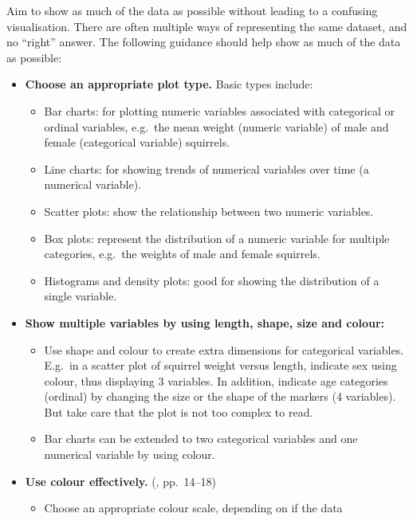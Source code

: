 \documentclass[10pt]{article}
\begin{document}
\begin{multicols}{3}
Aim to show as much of the data as possible without leading to a
confusing visualisation. There are often multiple ways of representing
the same dataset, and no ``right'' answer. The following guidance
should help show as much of the data as possible:
\begin{itemize}
\item \textbf{Choose an appropriate plot type.} Basic types include:
  \begin{itemize}
  \item Bar charts: for plotting numeric variables associated with
    categorical or ordinal variables, e.g.~the mean weight
    (numeric variable) of male and female (categorical variable)
    squirrels.
  \item Line charts: for showing trends of numerical variables over
    time (a numerical variable).
  \item Scatter plots: show the relationship between two numeric
    variables.
  \item Box plots: represent the distribution of a numeric variable for
    multiple categories, e.g.~the weights of male and female
    squirrels.
  \item Histograms and density plots: good for showing the
    distribution of a single variable.
  \end{itemize}
\item \textbf{Show multiple variables by using length, shape, size and colour:}
  \begin{itemize}
  \item Use shape and colour to create extra dimensions for
    categorical variables. E.g.~in a scatter plot of squirrel weight
    versus length, indicate sex using colour, thus displaying 3
    variables. In addition, indicate age categories (ordinal) by
    changing the size or the shape of the markers (4 variables).
    But take care that the plot is not too complex to read.
  \item Bar charts can be extended to two categorical variables and one
    numerical variable by using colour.
  \end{itemize}
\item \textbf{Use colour effectively.} (\citealp{WexlEtal17big}, pp.~14--18)
  \begin{itemize}
  \item Choose an appropriate colour scale, depending on if the data

\end{itemize}
\end{itemize}
\end{multicols}
\end{document}
